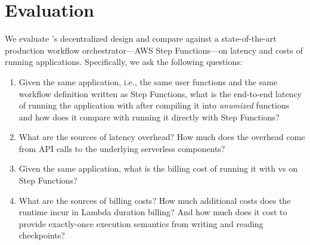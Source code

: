 \section{Evaluation}\label{sec:eval}

We evaluate \name{}'s decentralized design and compare against a
state-of-the-art production workflow orchestrator---AWS Step Functions---on
latency and costs of running applications. Specifically, we ask the following
questions:

\begin{enumerate}

    \item Given the same application, i.e., the same user functions and the
    same workflow definition written as Step Functions, what is the end-to-end
    latency of running the application with \name{} after compiling it into
    \textit{unumized} functions and how does it compare with running it
    directly with Step Functions?

    \item What are the sources of  latency overhead? How much does
    the overhead come from API calls to the underlying serverless components?

    \item Given the same application, what is the billing cost of running it
    with \name{} vs on Step Functions?

    \item What are the sources of  billing costs? How much additional
    costs does the \name{} runtime incur in Lambda duration billing? And how
    much does it cost to provide exactly-once execution semantics from writing
    and reading checkpoints?

\end{enumerate}





